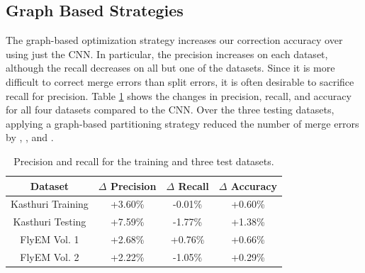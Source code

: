 \subsection{Graph Based Strategies}

The graph-based optimization strategy increases our correction accuracy over using just the CNN.
In particular, the precision increases on each dataset, although the recall decreases on all but one of the datasets.
Since it is more difficult to correct merge errors than split errors, it is often desirable to sacrifice recall for precision.
Table \ref{table:multicut} shows the changes in precision, recall, and accuracy for all four datasets compared to the CNN.
Over the three testing datasets, applying a graph-based partitioning strategy reduced the number of merge errors by , , and .

\begin{table}[h]
	\centering
	\begin{tabular}{c c c c} \hline
		\textbf{Dataset} & $\Delta$ \textbf{Precision} & $\Delta$ \textbf{Recall} & $\Delta$ \textbf{Accuracy} \\ \hline
		Kasthuri Training & +3.60\% & -0.01\% & +0.60\% \\
		Kasthuri Testing & +7.59\% & -1.77\% & +1.38\% \\
		FlyEM Vol. 1 & +2.68\% & +0.76\% & +0.66\% \\
		FlyEM Vol. 2 & +2.22\% & -1.05\% & +0.29\% \\ \hline
	\end{tabular}
	\caption{Precision and recall for the training and three test datasets.}
	\label{table:multicut}
\end{table}
